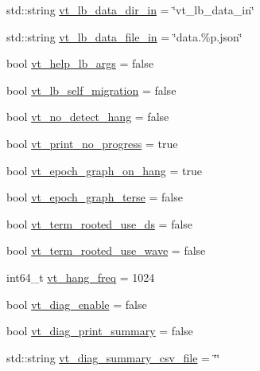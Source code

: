 \begin{DoxyCompactItemize}
std\+::string \hyperlink{structvt_1_1arguments_1_1_app_config_a2cc5cc4233969ea1e0ba153d5cf77f80}{vt\+\_\+lb\+\_\+data\+\_\+dir\+\_\+in} = \char`\"{}vt\+\_\+lb\+\_\+data\+\_\+in\char`\"{}
\item 
std\+::string \hyperlink{structvt_1_1arguments_1_1_app_config_a630f290b833799e6cf08a96585443aaf}{vt\+\_\+lb\+\_\+data\+\_\+file\+\_\+in} = \char`\"{}data.\%p.\+json\char`\"{}
\item 
bool \hyperlink{structvt_1_1arguments_1_1_app_config_a051fa77230596089ecb7b88cb62ae5bb}{vt\+\_\+help\+\_\+lb\+\_\+args} = false
\item 
bool \hyperlink{structvt_1_1arguments_1_1_app_config_a14f9206360ee902f908670fce103f96b}{vt\+\_\+lb\+\_\+self\+\_\+migration} = false
\item 
bool \hyperlink{structvt_1_1arguments_1_1_app_config_a5cab0e03f494700d6b27aff2c8a1399c}{vt\+\_\+no\+\_\+detect\+\_\+hang} = false
\item 
bool \hyperlink{structvt_1_1arguments_1_1_app_config_ab8b0ebcbe69f49e525bf5ce152ad43f5}{vt\+\_\+print\+\_\+no\+\_\+progress} = true
\item 
bool \hyperlink{structvt_1_1arguments_1_1_app_config_af7f54f986814f23a1c53932f8bf52e3c}{vt\+\_\+epoch\+\_\+graph\+\_\+on\+\_\+hang} = true
\item 
bool \hyperlink{structvt_1_1arguments_1_1_app_config_a25d80ec055614d39dd4039dde1faa94e}{vt\+\_\+epoch\+\_\+graph\+\_\+terse} = false
\item 
bool \hyperlink{structvt_1_1arguments_1_1_app_config_ae30cd8bb7ca3829fec86f46834a3270c}{vt\+\_\+term\+\_\+rooted\+\_\+use\+\_\+ds} = false
\item 
bool \hyperlink{structvt_1_1arguments_1_1_app_config_ac850fa3db23b49940d9f710c66639189}{vt\+\_\+term\+\_\+rooted\+\_\+use\+\_\+wave} = false
\item 
int64\+\_\+t \hyperlink{structvt_1_1arguments_1_1_app_config_a87132fc94952be73006d525f7d242349}{vt\+\_\+hang\+\_\+freq} = 1024
\item 
bool \hyperlink{structvt_1_1arguments_1_1_app_config_a35f135d830a4bb60edfdebfd33b2f2b4}{vt\+\_\+diag\+\_\+enable} = false
\item 
bool \hyperlink{structvt_1_1arguments_1_1_app_config_a7105cf4ae1b7b6ead255124994d9ea8c}{vt\+\_\+diag\+\_\+print\+\_\+summary} = false
\item 
std\+::string \hyperlink{structvt_1_1arguments_1_1_app_config_a35b0bd57e91e156660d7e5acbcbc8d28}{vt\+\_\+diag\+\_\+summary\+\_\+csv\+\_\+file} = \char`\"{}\char`\"{}
\item 

\end{DoxyCompactItemize}

